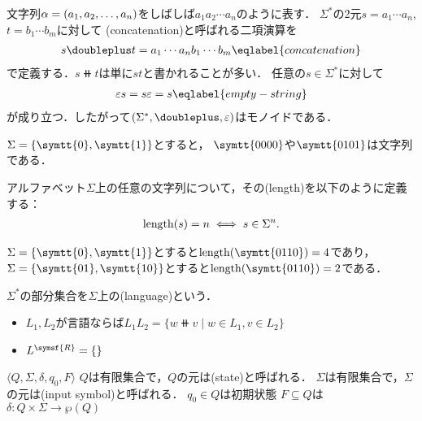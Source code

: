 \documentclass[../main.tex]{subfiles}
\begin{document}
文字列\(\alpha = (a_1, a_2,\ldots, a_n)\)をしばしば\(a_1 a_2 \cdots a_n\)のように表す．
\(\Sigma^{\mathord{*}}\)の2元\(s = a_1 \cdots a_n\), \(t = b_1 \cdots b_m\)に対して
(concatenation)と呼ばれる二項演算を
\begin{align}
    s \doubleplus t = a_1 \cdots a_n b_1 \cdots b_m
    \eqlabel{concatenation}
\end{align}
で定義する．\(s \doubleplus t\)は単に\(st\)と書かれることが多い．
任意の\(s \in \Sigma^{\mathord{*}}\)に対して
\begin{align}
    \varepsilon s = s \varepsilon = s \eqlabel{empty-string}
\end{align}
が成り立つ．したがって\(\tuple{ \Sigma^*, \doubleplus, \varepsilon }\)はモノイドである．

\begin{exa} \(\Sigma = \{\symtt{0}, \symtt{1}\}\)とすると，
\(\symtt{0000}\)や\(\symtt{0101}\)は文字列である．
\end{exa}

\begin{thmbox}
\begin{definition}
アルファベット\(\Sigma\)上の任意の文字列について，その(length)を以下のように定義する：
\begin{align*}
    \operatorname{length} (s) = n \; \Longleftrightarrow \; s \in \Sigma^n.
\end{align*}
\end{definition}
\end{thmbox}

\begin{exa} \(\Sigma = \{\symtt{0}, \symtt{1}\}\)とすると\(\len(\symtt{0110}) = 4\)であり，
\(\Sigma = \{\symtt{01}, \symtt{10}\}\)とすると\(\len(\symtt{0110}) = 2\)である．
\end{exa}


\begin{definition} \(\Sigma^{\mathord{*}}\)の部分集合を\(\Sigma\)上の(language)という．
\begin{itemize}
    \item \(L_1, L_2\)が言語ならば\(L_1L_2 = \{ w \doubleplus v \mid w \in L_1, v \in L_2 \}\)
    \item \(L^{\symsf{R}} = \{ \}\)
\end{itemize}
\end{definition}


\begin{definition}
\(\langle Q, \Sigma, \delta, q_0, F \rangle\)
\(Q\)は有限集合で，\(Q\)の元は(state)と呼ばれる．
\(\Sigma\)は有限集合で，\(\Sigma\)の元は(input symbol)と呼ばれる．
\(q_0 \in Q\)は初期状態
\(F \subseteq Q\)は
\(\delta\colon Q \times \Sigma \to \wp(Q)\)
\end{definition}
\end{document}
